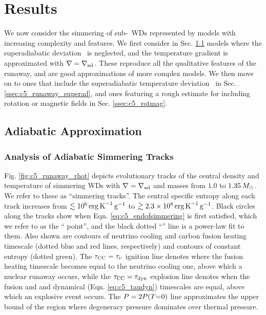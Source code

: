 \section{Results}
\label{sec:c5_results}

We now consider the simmering of sub-\Mch\ WDs represented by models with increasing complexity and features.  We first consider in Sec. \ref{ssec:c5_runaway_ad} models where the superadiabatic deviation \dnabconv\ is neglected, and the temperature gradient is approximated with $\nabla = \nablaad$. These reproduce all the qualitative features of the runaway, and are good approximations of more complex models.  We then move on to ones that include the superadiabatic temperature deviation \dnabconv\ in Sec. \ref{ssec:c5_runaway_superad}, and ones featuring a rough estimate for including rotation or magnetic fields in Sec. \ref{ssec:c5_rotmag}.

\subsection{Adiabatic Approximation}
\label{ssec:c5_runaway_ad}

\subsubsection{Analysis of Adiabatic Simmering Tracks}
\label{ssec:c5_runaway_ad_analysis}

Fig. \ref{fig:c5_runaway_rhot} depicts evolutionary tracks of the central density and temperature of simmering WDs with $\nabla = \nablaad$ and masses from $1.0$ to $1.35\,\Msun$.  We refer to these as ``simmering tracks''.  The central specific entropy along each track increases from $\lesssim10^6\,\ergpKg$ to $\gtrsim2.3\times10^8\,\ergpKg$.  Black circles along the tracks show when Eqn. \ref{eq:c5_endofsimmering} is first satisfied, which we refer to as the ``\citeal{wooswk04} point'', and the black dotted ``\citeal{wooswk04}'' line is a power-law fit to them.  Also shown are contours of neutrino cooling and carbon fusion heating timescale (dotted blue and red lines, respectively) and contours of constant entropy (dotted green).  The $\taucc = \taunu$ ignition line denotes where the fusion heating timescale becomes equal to the neutrino cooling one, above which a nuclear runaway occurs, while the $\taucc = \taudyn$ explosion line denotes when the fusion and and dynamical (Eqn. \ref{eq:c5_taudyn}) timescales are equal, above which an explosive event occurs.  The $P = 2P(T\mathrm{=}0)$ line approximates the upper bound of the region where degeneracy pressure dominates over thermal pressure.

